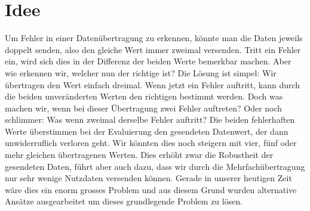 %
%
\section{Idee
\label{reedsolomon:section:idee}}
Um Fehler in einer Datenübertragung zu erkennen, könnte man die Daten jeweils doppelt senden,
also den gleiche Wert immer zweimal versenden. 
Tritt ein Fehler ein, wird sich dies in der Differenz der beiden Werte bemerkbar machen.
Aber wie erkennen wir, welcher nun der richtige ist? Die Lösung ist simpel: Wir übertragen den Wert einfach dreimal.
Wenn jetzt ein Fehler auftritt, kann durch die beiden unveränderten Werten den richtigen bestimmt werden.
Doch was machen wir, wenn bei dieser Übertragung zwei Fehler auftreten? 
Oder noch schlimmer: Was wenn zweimal derselbe Fehler auftritt? 
Die beiden fehlerhaften Werte überstimmen bei der Evaluierung den gesendeten Datenwert, der dann unwiderruflich verloren geht. 
Wir könnten dies noch steigern mit vier, fünf oder mehr gleichen übertragenen Werten.
Dies erhöht zwar die Robustheit der gesendeten Daten, führt aber auch dazu, dass wir durch die Mehrfachübertragung nur sehr wenige Nutzdaten versenden können.
Gerade in unserer heutigen Zeit wäre dies ein enorm grosses Problem und aus diesem Grund wurden alternative Ansätze ausgearbeitet um dieses grundlegende Problem zu lösen. 
%
%
%
%
%
%
%
%
%
%
% 
%
%
%
%
%
